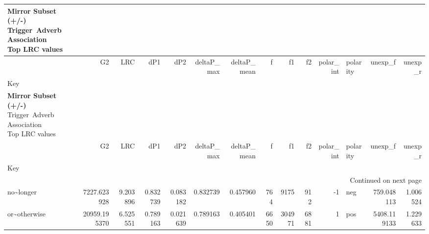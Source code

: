 
\begin{longtable}[ht]{lrrrrrrrrrrlrr}
\caption{\textbf{Mirror Subset (+/-)}\\Trigger~Adverb Association\\Top LRC values} \label{trig-adv-AMtop-Mirror} \\
\toprule
 & G2 & LRC & dP1 & dP2 & deltaP\_max & deltaP\_mean & f & f1 & f2 & polar\_int & polarity & unexp\_f & unexp\_r \\
Key &  &  &  &  &  &  &  &  &  &  &  &  &  \\
\midrule
\endfirsthead
\caption[]{\textbf{Mirror Subset (+/-)}\\Trigger~Adverb Association\\Top LRC values} \\
\toprule
 & G2 & LRC & dP1 & dP2 & deltaP\_max & deltaP\_mean & f & f1 & f2 & polar\_int & polarity & unexp\_f & unexp\_r \\
Key &  &  &  &  &  &  &  &  &  &  &  &  &  \\
\midrule
\endhead
\midrule
\multicolumn{14}{r}{Continued on next page} \\
\midrule
\endfoot
\bottomrule
\endlastfoot
no\textasciitilde longer & {\cellcolor[HTML]{CC9FCD}} \color[HTML]{000000} 7227.623928 & {\cellcolor[HTML]{67001F}} \color[HTML]{F1F1F1} 9.203896 & {\cellcolor[HTML]{67001F}} \color[HTML]{F1F1F1} 0.832739 & {\cellcolor[HTML]{CB99CA}} \color[HTML]{F1F1F1} 0.083182 & {\cellcolor[HTML]{67001F}} \color[HTML]{F1F1F1} 0.832739 & {\cellcolor[HTML]{67001F}} \color[HTML]{F1F1F1} 0.457960 & {\cellcolor[HTML]{E9E3F0}} \color[HTML]{000000} 764 & {\cellcolor[HTML]{F3F0F7}} \color[HTML]{000000} 9175 & {\cellcolor[HTML]{F7F4F9}} \color[HTML]{000000} 912 & {\cellcolor[HTML]{F7F4F9}} \color[HTML]{000000} -1 & neg & {\cellcolor[HTML]{E6DEEE}} \color[HTML]{000000} 759.048113 & {\cellcolor[HTML]{F7F4F9}} \color[HTML]{000000} 1.006524 \\
or\textasciitilde otherwise & {\cellcolor[HTML]{67001F}} \color[HTML]{F1F1F1} 20959.195370 & {\cellcolor[HTML]{E060AD}} \color[HTML]{F1F1F1} 6.525551 & {\cellcolor[HTML]{7B002E}} \color[HTML]{F1F1F1} 0.789163 & {\cellcolor[HTML]{EDE8F3}} \color[HTML]{000000} 0.021639 & {\cellcolor[HTML]{7D002F}} \color[HTML]{F1F1F1} 0.789163 & {\cellcolor[HTML]{970042}} \color[HTML]{F1F1F1} 0.405401 & {\cellcolor[HTML]{67001F}} \color[HTML]{F1F1F1} 6650 & {\cellcolor[HTML]{67001F}} \color[HTML]{F1F1F1} 304971 & {\cellcolor[HTML]{D6BCDC}} \color[HTML]{000000} 6881 & {\cellcolor[HTML]{67001F}} \color[HTML]{F1F1F1} 1 & pos & {\cellcolor[HTML]{67001F}} \color[HTML]{F1F1F1} 5408.119133 & {\cellcolor[HTML]{BD0C50}} \color[HTML]{F1F1F1} 1.229633 \\

\end{longtable}
